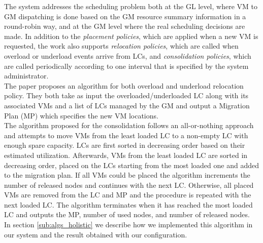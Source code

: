 The system addresses the scheduling problem both at the GL level, where VM to GM dispatching is done based on the GM resource summary information in a round-robin way, and at the GM level where the real scheduling decisions are made. In addition to the \textit{placement policies}, which are applied when a new VM is requested, the work also supports \textit{relocation policies}, which are called when overload or underload events arrive from LCs, and \textit{consolidation policies}, which are called periodically according to one interval that is specified by the system administrator.\\
The paper proposes an algorithm for both overload and underload relocation policy. They both take as input the overloaded/underloaded LC along with its associated VMs and a list of LCs managed by the GM and output a Migration Plan (MP) which specifies the new VM locations.\\
The algorithm proposed for the consolidation follows an all-or-nothing approach and attempts to move VMs from the least loaded LC to a non-empty LC with enough spare capacity.  LCs are first sorted in decreasing order based on their estimated utilization. Afterwards, VMs from the least loaded LC are sorted in decreasing order, placed on the LCs starting from the most loaded one and added to the migration plan. If all VMs could be placed the algorithm increments the number of released nodes and continues with the next LC. Otherwise, all placed VMs are removed from the LC and MP and the procedure is repeated with the next loaded LC. The algorithm terminates when it has reached the most loaded LC and outputs the MP, number of used nodes, and number of released nodes\cite[p.~208]{Feller:2012kf}.\\
In section \ref{sub:algs_holistic} we describe how we implemented this algorithm in our system and the result obtained with our configuration.


